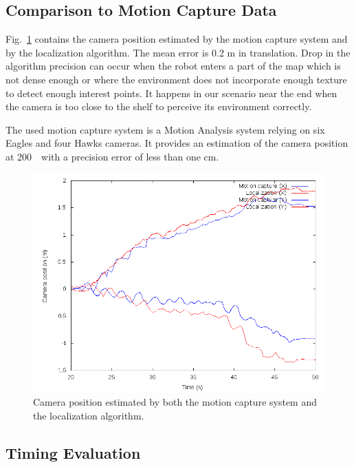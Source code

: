 \subsection{Comparison to Motion Capture Data}\label{sec:mocap}

Fig.~\ref{tab:mocap_comparison} contains the camera position estimated
by the motion capture system and by the localization algorithm. The
mean error is 0.2 m in translation. Drop in the algorithm precision
can occur when the robot enters a part of the map which is not dense
enough or where the environment does not incorporate enough texture to
detect enough interest points. It happens in our scenario near the end
when the camera is too close to the shelf to perceive its environment
correctly.

The used motion capture system is a Motion Analysis system relying on
six Eagles and four Hawks cameras. It provides an estimation of the
camera position at 200~\hertz~with a precision error of less than one
cm.
%
\begin{figure}[ht!]
  \begin{center}
    \includegraphics[width=\linewidth]{data/mocap.png}
  \end{center}
  \caption{Camera position estimated by both the motion capture system
    and the localization algorithm. \label{tab:mocap_comparison}}
\end{figure}
%
\subsection{Timing Evaluation}\label{sec:timing}

